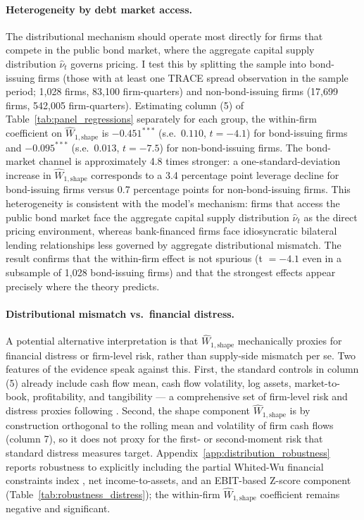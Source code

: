 \paragraph{Heterogeneity by debt market access.}
The distributional mechanism should operate most directly for firms that compete in the public bond market, where the aggregate capital supply distribution $\hat{\nu}_t$ governs pricing. I test this by splitting the sample into bond-issuing firms (those with at least one TRACE spread observation in the sample period; 1,028 firms, 83,100 firm-quarters) and non-bond-issuing firms (17,699 firms, 542,005 firm-quarters). Estimating column (5) of Table~\ref{tab:panel_regressions} separately for each group, the within-firm coefficient on $\widehat{W}_{1,\text{shape}}$ is $-0.451^{***}$ (s.e.\ $0.110$, $t = -4.1$) for bond-issuing firms and $-0.095^{***}$ (s.e.\ $0.013$, $t = -7.5$) for non-bond-issuing firms. The bond-market channel is approximately 4.8 times stronger: a one-standard-deviation increase in $\widehat{W}_{1,\text{shape}}$ corresponds to a 3.4 percentage point leverage decline for bond-issuing firms versus 0.7 percentage points for non-bond-issuing firms. This heterogeneity is consistent with the model's mechanism: firms that access the public bond market face the aggregate capital supply distribution $\hat{\nu}_t$ as the direct pricing environment, whereas bank-financed firms face idiosyncratic bilateral lending relationships less governed by aggregate distributional mismatch. The result confirms that the within-firm effect is not spurious (t $= -4.1$ even in a subsample of 1,028 bond-issuing firms) and that the strongest effects appear precisely where the theory predicts.

\paragraph{Distributional mismatch vs.\ financial distress.}
A potential alternative interpretation is that $\widehat{W}_{1,\text{shape}}$ mechanically proxies for financial distress or firm-level risk, rather than supply-side mismatch per se. Two features of the evidence speak against this. First, the standard controls in column (5) already include cash flow mean, cash flow volatility, log assets, market-to-book, profitability, and tangibility — a comprehensive set of firm-level risk and distress proxies following \citet{FrankGoyal2009capital}. Second, the shape component $\widehat{W}_{1,\text{shape}}$ is by construction orthogonal to the rolling mean and volatility of firm cash flows (column 7), so it does not proxy for the first- or second-moment risk that standard distress measures target. Appendix~\ref{app:distribution_robustness} reports robustness to explicitly including the partial Whited-Wu financial constraints index \citep{WhitedWu2006financial}, net income-to-assets, and an EBIT-based Z-score component \citep{Altman1968} (Table~\ref{tab:robustness_distress}); the within-firm $\widehat{W}_{1,\text{shape}}$ coefficient remains negative and significant.

